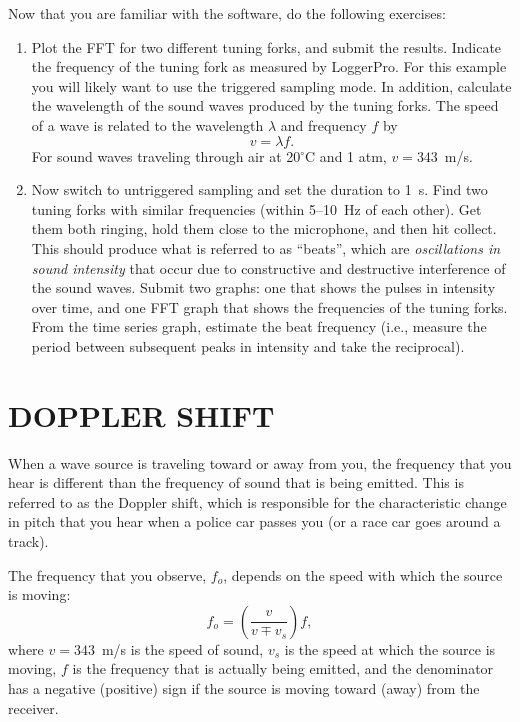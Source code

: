 \documentclass[11pt,letterpaper]{article}
\begin{document}
Now that you are familiar with the software, do the following exercises:
\begin{enumerate}
\item Plot the FFT for two different tuning forks, and submit the results. Indicate the frequency of the tuning fork as measured by LoggerPro. For this example you will likely want to use the triggered sampling mode. In addition, calculate the wavelength of the sound waves produced by the tuning forks. The speed of a wave is related to the wavelength $\lambda$ and frequency $f$ by
\begin{equation*}
v=\lambda f.
\end{equation*}
For sound waves traveling through air at 20$^\circ$C and 1 atm, $v=343$~m/s.
\item Now switch to untriggered sampling and set the duration to 1~s. Find two tuning forks with similar frequencies (within 5--10~Hz of each other). Get them both ringing, hold them close to the microphone, and then hit collect. This should produce what is referred to as ``beats'', which are \textit{oscillations in sound intensity} that occur due to constructive and destructive interference of the sound waves. Submit two graphs: one that shows the pulses in intensity over time, and one FFT graph that shows the frequencies of the tuning forks. From the time series graph, estimate the beat frequency (i.e., measure the period between subsequent peaks in intensity and take the reciprocal).

\end{enumerate}

\section{DOPPLER SHIFT}
When a wave source is traveling toward or away from you, the frequency that you hear is different than the frequency of sound that is being emitted. This is referred to as the Doppler shift, which is responsible for the characteristic change in pitch that you hear when a police car passes you (or a race car goes around a track).

The frequency that you observe, $f_o$, depends on the speed with which the source is moving:
\begin{equation}
f_o=\left(\frac{v}{v\mp{v_s}}\right)f,
\end{equation}
where $v=343$~m/s is the speed of sound, $v_s$ is the speed at which the source is moving, $f$ is the frequency that is actually being emitted, and the denominator has a negative (positive) sign if the source is moving toward (away) from the receiver. 
\end{document}
